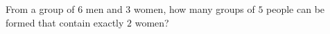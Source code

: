 From a group of $6$ men and $3$ women, how many groups of $5$ people can be formed that contain exactly $2$ women?
